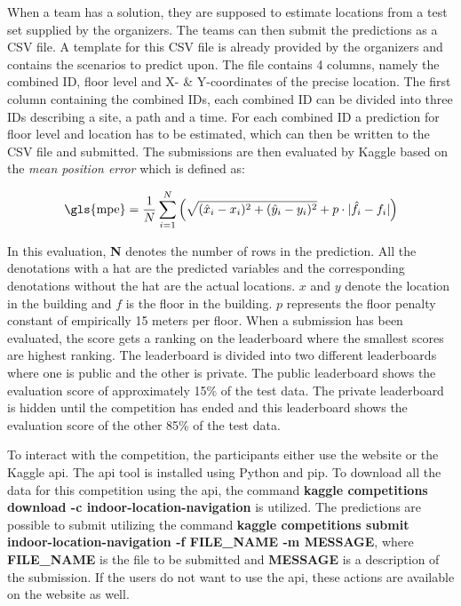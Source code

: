 When a team has a solution, they are supposed to estimate locations from a test set supplied by the organizers. The teams can then submit the predictions as a CSV file. A template for this CSV file is already provided by the organizers and contains the scenarios to predict upon. The file contains 4 columns, namely the combined ID, floor level and X- \& Y-coordinates of the precise location. The first column containing the combined IDs, each combined ID can be divided into three IDs describing a site, a path and a time. For each combined ID a prediction for floor level and location has to be estimated, which can then be written to the CSV file and submitted. The submissions are then evaluated by Kaggle based on the \textit{mean position error} which is defined as:

\begin{equation} \label{eq:MeanPositionError}
\text{\gls{mpe}} = \frac{1}{N} \sum_{i=1}^{N}  
                                                \left( \sqrt{( \hat{x}_i - x_i )^{2} + ( \hat{y}_i - y_i )^{2}} 
                                                + p \cdot | \hat{f}_{i} - f_i | \right) 
\end{equation}

In this evaluation, \textbf{N} denotes the number of rows in the prediction. All the denotations with a hat are the predicted variables and the corresponding denotations without the hat are the actual locations. $x$ and $y$ denote the location in the building and $f$ is the floor in the building. $p$ represents the floor penalty constant of empirically 15 meters per floor\cite{MicrosoftConversation}. When a submission has been evaluated, the score gets a ranking on the leaderboard where the smallest scores are highest ranking. The leaderboard is divided into two different leaderboards where one is public and the other is private. The public leaderboard shows the evaluation score of approximately 15\% of the test data. The private leaderboard is hidden until the competition has ended and this leaderboard shows the evaluation score of the other 85\% of the test data.\cite{CompetitionSite}

To interact with the competition, the participants either use the website or the Kaggle \gls{api}. The \gls{api} tool is installed using Python and \gls{pip}. To download all the data for this competition using the \gls{api}, the command \textbf{kaggle competitions download -c indoor-location-navigation} is utilized. The predictions are possible to submit utilizing the command \textbf{kaggle competitions submit indoor-location-navigation -f FILE\_NAME -m MESSAGE}, where \textbf{FILE\_NAME} is the file to be submitted and \textbf{MESSAGE} is a description of the submission.\cite{KaggleAPI} If the users do not want to use the \gls{api}, these actions are available on the website as well.

